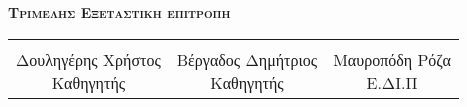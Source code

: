            \begin{center}
	
	       
    \end{center}
    
    \begin{tabular}{ll}
	
	\end{tabular}
	\vspace{10.5cm}
    \begin{center}
    \Large
    \textbf{\textsc{Τριμελης Εξεταστικη επιτροπη}}
    \end{center}




    
	
	\vspace{1.5cm}
    

    \vspace{1.5cm}
	
	\begin{center}
	\noindent\begin{tabular}{ccc}
		\makebox[0.3\textwidth]{\hrulefill} & 
		\makebox[0.3\textwidth]{\hrulefill} & 
		\makebox[0.3\textwidth]{\hrulefill} \\

		\specialcell{Δουληγέρης Χρήστος \\ Καθηγητής} & 
		\specialcell{Βέργαδος Δημήτριος \\ Καθηγητής} & 
		\specialcell{Μαυροπόδη Ρόζα \\ Ε.ΔΙ.Π} \\ [8ex]%
	\end{tabular}
	\end{center}